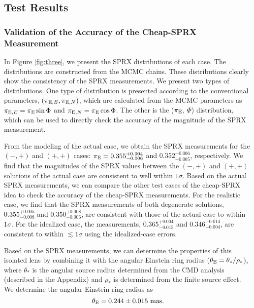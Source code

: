 \documentclass[10pt]{emulateapj}
\begin{document}
\subsection{Test Results}

\subsubsection{Validation of the Accuracy of the Cheap-SPRX Measurement}

 In Figure \ref{fig:three}, we present the SPRX distributions of each case. The distributions are 
constructed from the MCMC chains. These distributions clearly show the consistency of the SPRX 
measurements. We present two types of distributions. One type of distribution is presented according 
to the conventional parameters, $(\pi_{{\rm E},E}, \pi_{{\rm E},N})$, which are calculated from the MCMC parameters 
as $\pi_{{\rm E},E}=\pi_{\rm E}\sin{\Phi}$ and $\pi_{{\rm E},N}=\pi_{\rm E}\cos{\Phi}$. The other 
is the ($\pi_{\rm E}$, $\Phi$) distribution, which can be used to directly check the accuracy of the 
magnitude of the SPRX measurement. 

 From the modeling of the actual case, we obtain the SPRX measurements for the $(-,+)$ and $(+,+)$ 
cases: $\pi_{\rm E}=0.355^{+0.004}_{-0.006}$ and $0.352^{+0.006}_{-0.005}$, respectively. 
We find that the magnitudes of the SPRX values between the $(-,+)$ and $(+,+)$ solutions of the actual 
case are consistent to well within $1\sigma$. Based on the actual SPRX measurements, we can compare 
the other test cases of the cheap-SPRX idea to check the accuracy of the cheap-SPRX measurements. 
For the realistic case, we find that the SPRX measurements of both degenerate solutions, 
$0.355^{+0.005}_{-0.008}$ and $0.350^{+0.008}_{-0.006}$, are consistent with those of the actual case 
to within $1\sigma$. 
For the idealized case, the measurements, $0.365^{+0.004}_{-0.015}$ and $0.346^{+0.014}_{-0.004}$, are
consistent to within $\lesssim 1 \sigma$ using the idealized-case errors.

 Based on the SPRX measurements, we can determine the properties of this isolated lens by combining 
it with the angular Einstein ring radius ($\theta_{\rm E}=\theta_{\ast}/\rho_{\ast}$), where 
$\theta_{\ast}$ is the angular source radius determined from the CMD analysis (described in the 
Appendix) and $\rho_{\ast}$ is determined from the finite source effect. We determine the angular 
Einstein ring radius as
\begin{equation}
\theta_{\rm E} = 0.244 \pm 0.015 ~{\rm mas}.
\end{equation}
\end{document}
